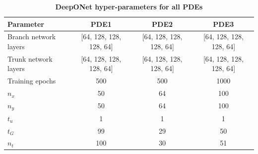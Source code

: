 \begin{table}[htbp]
\centering
\caption{\scriptsize\textbf{DeepONet hyper-parameters for all PDEs}}
\label{tab:deeponet_hparams}
\scriptsize
\setlength{\tabcolsep}{5pt}
\begin{tabular}{lccc}
\hline
\textbf{Parameter} & \textbf{PDE1} & \textbf{PDE2} & \textbf{PDE3} \\
\hline
Branch network layers & [64, 128, 128, 128, 64] & [64, 128, 128, 128, 64] & [64, 128, 128, 128, 64] \\
Trunk network layers & [64, 128, 128, 128, 64] & [64, 128, 128, 128, 64] & [64, 128, 128, 128, 64] \\
Training epochs & 500 & 500 & 1000\\
$n_x$ & 50& 64& 100\\
$n_y$ & 50& 64& 100\\
$t_u$ &  1&  1&  1\\
$t_G$ &  99&  29&  50\\
$n_t$ & 100& 30& 51\\
\hline
\end{tabular}
\end{table}














